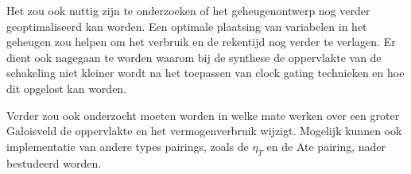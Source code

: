 Het zou ook nuttig zijn te onderzoeken of het geheugenontwerp nog verder geoptimaliseerd kan worden. Een optimale plaatsing van variabelen in het geheugen zou helpen om het verbruik en de rekentijd nog verder te verlagen. Er dient ook nagegaan te worden waarom bij de synthese de oppervlakte van de schakeling niet kleiner wordt na het toepassen van clock gating technieken en hoe dit opgelost kan worden.

Verder zou ook onderzocht moeten worden in welke mate werken over een groter Galoisveld de oppervlakte en het vermogenverbruik wijzigt. Mogelijk kunnen ook implementatie van andere types pairings, zoals de $\eta_T$ en de Ate pairing, nader bestudeerd worden.

